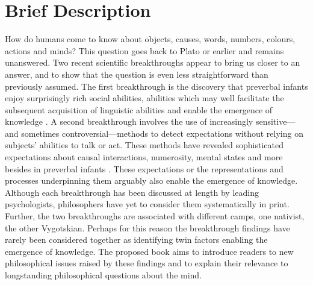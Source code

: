 \documentclass[12pt,\papersize]{extarticle}
\date{}
\begin{document}
\setlength\footnotesep{1em}




\maketitle

\setcounter{secnumdepth}{-1} 



\section{Brief Description}
How do humans come to know about %
objects,
causes,
words,
numbers,
colours,
actions
and
minds? 
This question goes back to Plato or earlier and remains unanswered.
Two recent scientific breakthroughs appear to bring us closer to an answer, and to show that the question is even less straightforward than previously  assumed.
The first breakthrough is the discovery that preverbal infants enjoy surprisingly rich social abilities, abilities which
may well facilitate the subsequent acquisition of linguistic abilities and enable the emergence of knowledge \citep[e.g.][]{Csibra:2009xr,Meltzoff:2007pj,Tomasello:2005wx}. 
A second breakthrough involves the use of increasingly sensitive---and sometimes controversial---methods to detect  expectations without relying on subjects' abilities to talk or act.  
These methods have revealed sophisticated expectations about  causal interactions, numerosity, mental states and more besides in preverbal infants \citep[e.g.][]{Spelke:1990jn,Baillargeon:gx}.
These expectations or the representations and processes underpinning them arguably also enable the emergence of knowledge. 
Although each breakthrough has been discussed at length by leading psychologists, philosophers have yet to consider them systematically in print.
Further, the two breakthroughs are associated with different camps, one nativist, the other Vygotskian.
Perhaps for this reason the breakthrough findings have rarely been considered together as identifying twin factors enabling the emergence of knowledge.
The proposed book aims to introduce readers to  
new philosophical issues raised by these findings  
and to explain their relevance to longstanding philosophical questions about the mind.  
\end{document}
